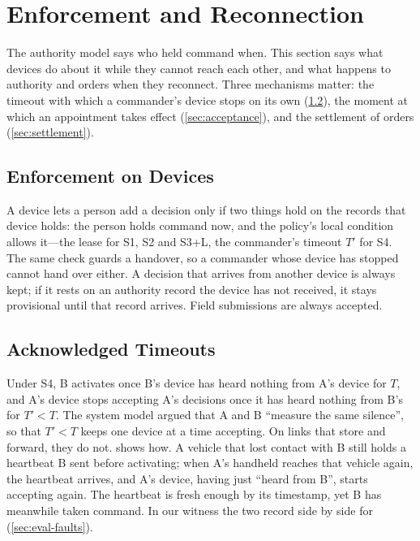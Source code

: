 \section{Enforcement and Reconnection}
\label{sec:enforcement}

The authority model says who held command when. This section says what devices do about
it while they cannot reach each other, and what happens to authority and orders when they
reconnect. Three mechanisms matter: the timeout with which a commander's device stops on
its own (\cref{sec:ack}), the moment at which an appointment takes effect
(\cref{sec:acceptance}), and the settlement of orders (\cref{sec:settlement}).

\subsection{Enforcement on Devices}
\label{sec:device-enforcement}

A device lets a person add a decision only if two things hold on the records that device
holds: the person holds command now, and the policy's local condition allows it---the
lease for S1, S2 and S3+L, the commander's timeout $T'$ for S4. The same check guards a
handover, so a commander whose device has stopped cannot hand over either. A decision that
arrives from another device is always kept; if it rests on an authority record the device
has not received, it stays provisional until that record arrives. Field submissions are
always accepted.

\subsection{Acknowledged Timeouts}
\label{sec:ack}

Under S4, B activates once B's device has heard nothing from A's device for $T$, and A's
device stops accepting A's decisions once it has heard nothing from B's for $T' < T$. The
system model argued that A and B ``measure the same silence'', so that $T' < T$ keeps one
device at a time accepting. On links that store and forward, they do not.
 shows how. A vehicle that lost contact with B still holds a heartbeat
B sent before activating; when A's handheld reaches that vehicle again, the heartbeat
arrives, and A's device, having just ``heard from B'', starts accepting again. The
heartbeat is fresh enough by its timestamp, yet B has meanwhile taken command. In our
witness the two record side by side for \tbRelayOverlap{} (\cref{sec:eval-faults}).

